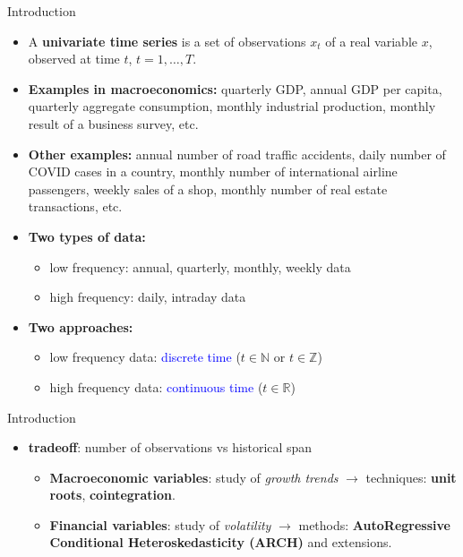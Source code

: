 \documentclass{beamer}
\begin{document}
\begin{frame}{Introduction}
\begin{itemize}
    \item A \textbf{univariate time series} is a set of observations $x_t$ of a real variable $x$, observed at time $t$, $t = 1, \ldots, T$.
    \vspace{0.2cm}
    \item \textbf{Examples in macroeconomics:} quarterly GDP, annual GDP per capita, quarterly aggregate consumption, monthly industrial production, monthly result of a business survey, etc.
    \vspace{0.2cm}
    \item \textbf{Other examples:} annual number of road traffic accidents, daily number of COVID cases in a country, monthly number of international airline passengers, weekly sales of a shop, monthly number of real estate transactions, etc.
    \vspace{0.2cm}
    \item \textbf{Two types of data:}
    \begin{itemize}
        \item low frequency: annual, quarterly, monthly, weekly data
        \item high frequency: daily, intraday data
    \end{itemize}
    \vspace{0.2cm}
    \item \textbf{Two approaches:}
    \begin{itemize}
        \item low frequency data: \textcolor{blue}{discrete time} ($t \in \mathbb{N}$ or $t \in \mathbb{Z}$)
        \item high frequency data: \textcolor{blue}{continuous time} ($t \in \mathbb{R}$)
    \end{itemize}
\end{itemize}
\end{frame}

\begin{frame}{Introduction}
    \begin{itemize}
  \item \textbf{tradeoff}: number of observations vs historical span
  \begin{itemize}
    \item \textbf{Macroeconomic variables}: study of \textit{growth trends} $\rightarrow$ techniques: \textbf{unit roots}, \textbf{cointegration}.
    \item \textbf{Financial variables}: study of \textit{volatility} $\rightarrow$ methods: \textbf{AutoRegressive Conditional Heteroskedasticity (ARCH)} and extensions.
  \end{itemize}
\end{itemize}
\end{frame}
\end{document}
